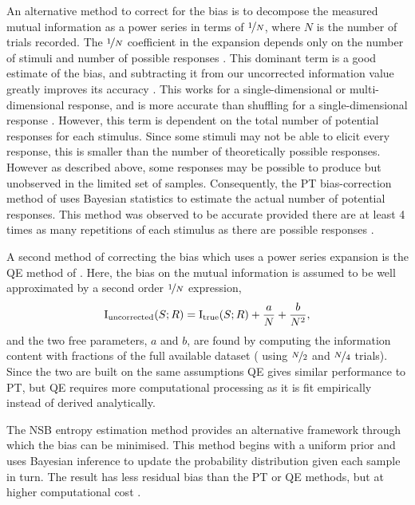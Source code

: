 An alternative method to correct for the bias is to decompose the measured mutual information as a power series in terms of $\nicefrac{1}{N}$, where $N$ is the number of trials recorded.
The $\nicefrac{1}{N}$ coefficient in the expansion depends only on the number of stimuli and number of possible responses \citep{Miller1955,Treves1995}.
This dominant term is a good estimate of the bias, and subtracting it from our uncorrected information value greatly improves its accuracy \citep{Treves1995}.
This works for a single-dimensional or multi-dimensional response, and is more accurate than shuffling for a single-dimensional response \citep{Panzeri1996}.
However, this term is dependent on the total number of potential responses for each stimulus.
Since some stimuli may not be able to elicit every response, this is smaller than the number of theoretically possible responses.
However as described above, some responses may be possible to produce but unobserved in the limited set of samples.
Consequently, the \ac{PT} bias-correction method of \citet{Panzeri1996} uses Bayesian statistics to estimate the actual number of potential responses.
This method was observed to be accurate provided there are at least \num{4} times as many repetitions of each stimulus as there are possible responses \citep{Panzeri2007}.

A second method of correcting the bias which uses a power series expansion is the \ac{QE} method of \citet{Strong1998}.
Here, the bias on the mutual information is assumed to be well approximated by a second order $\nicefrac{1}{N}$ expression,
\begin{equation}
\operatorname{I}_{\text{uncorrected}}(S;R) =
\operatorname{I}_{\text{true}}(S;R) + \frac{a}{N} + \frac{b}{N^2}
,\end{equation}
and the two free parameters, $a$ and $b$, are found by computing the information content with fractions of the full available dataset (\ie{} using $\nicefrac{N}{2}$ and $\nicefrac{N}{4}$ trials).
Since the two are built on the same assumptions \ac{QE} gives similar performance to \ac{PT}, but \ac{QE} requires more computational processing as it is fit empirically instead of derived analytically.


The \ac{NSB} entropy estimation method \citep{Nemenman2004} provides an alternative framework through which the bias can be minimised.
This method begins with a uniform prior and uses Bayesian inference to update the probability distribution given each sample in turn.
The result has less residual bias than the \ac{PT} or \ac{QE} methods, but at higher computational cost \citep{Panzeri2007}.

